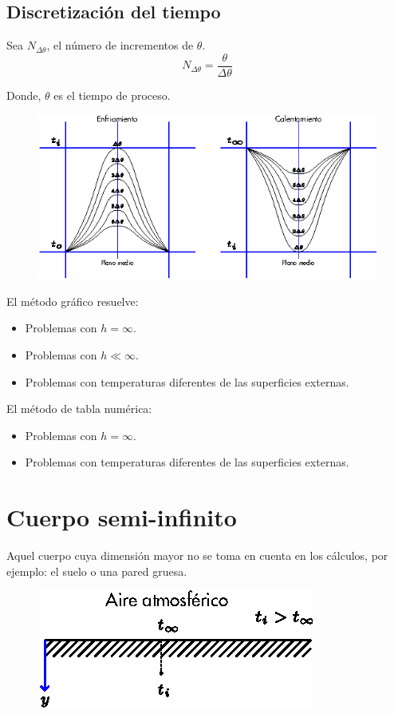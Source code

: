 \subsection{Discretización del tiempo}
Sea $N_{\Delta\theta}$, el número de incrementos de $\theta$.
\begin{equation*}
    N_{\Delta\theta}=\frac{\theta}{\Delta\theta}
\end{equation*}

Donde, $\theta$ es el tiempo de proceso.
\begin{figure}[!h]
\centering
\includegraphics[scale=2.20]{figura03_09.eps}
\end{figure}

El método gráfico resuelve:
\begin{itemize}
    \item Problemas con $h=\infty$.
    \item Problemas con $h\ll\infty$.
    \item Problemas con temperaturas diferentes de las superficies externas.
\end{itemize}

El método de tabla numérica:
\begin{itemize}
    \item Problemas con $h=\infty$.
    \item Problemas con temperaturas diferentes de las superficies externas.
\end{itemize}

\section{Cuerpo semi-infinito}
Aquel cuerpo cuya dimensión mayor no se toma en cuenta en los cálculos, por
ejemplo: el suelo o una pared gruesa.
\begin{figure}[!h]
\centering
\includegraphics[scale=1.50]{figura03_10.eps}
\end{figure}

